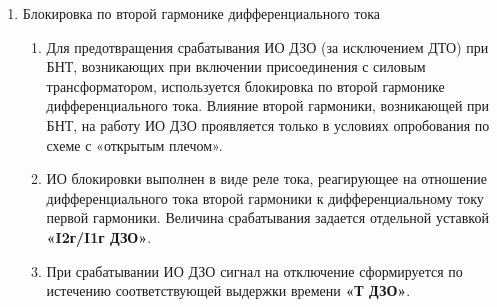 \begin{enumerate}[label=\arabic{section}.\arabic{subsection}.\arabic{enumi}, labelsep=4pt, leftmargin=0pt, itemindent=57pt, itemsep=0pt, parsep=5pt]
\begin{enumerate}[label=\arabic{section}.\arabic{subsection}.\arabic{enumi}.\arabic*, labelsep=4pt, leftmargin=0em, itemindent=65pt, parsep=0pt]
\item
В устройстве предусмотрено два подхода для надежного отключения выключателей присоединений при
работе ДЗО, в том числе в режимах АПВ шин и опробования. Такие режимы могут сопровождаться пониженным
уровнем токов КЗ, в результате чего чувствительность дифференциальных органов может быть недостаточной.
Первый подход подразумевает применение ЧТО. Второй подход заключается в очувствлении уставок
тормозной характеристики, которые используются в ДОТХ, БДО и МДО.

\item
ЧТО выполнен в виде реле тока, включенного на дифференциальный ток. Ток срабатывания ЧТО задается отдельной уставкой: \textbf{«Iчто»}.

\item
Очувствление представляет собой автоматическую смену величины начального тока срабатывания
тормозной характеристики на более чувствительную уставку. Параметры тормозной характеристики в режиме
очувствления задаются отдельными уставками. Подробное описание алгоритма очувствления приведен в
разделе {\color{red}«Логика очувствления»}.

\end{enumerate}


\item Блокировка по второй гармонике дифференциального тока

\begin{enumerate}[label=\arabic{section}.\arabic{subsection}.\arabic{enumi}.\arabic*, labelsep=4pt, leftmargin=0em, itemindent=65pt, parsep=0pt]

\item
Для предотвращения срабатывания ИО ДЗО (за исключением ДТО) при БНТ, возникающих при
включении присоединения с силовым трансформатором, используется блокировка по второй гармонике
дифференциального тока. Влияние второй гармоники, возникающей при БНТ, на работу ИО ДЗО проявляется
только в условиях опробования по схеме с «открытым плечом».

\item
ИО блокировки выполнен в виде реле тока, реагирующее на отношение дифференциального тока второй
гармоники к дифференциальному току первой гармоники. Величина срабатывания задается отдельной
уставкой \textbf{«I2г/I1г ДЗО»}.

\item
При срабатывании ИО ДЗО сигнал на отключение сформируется по истечению соответствующей выдержки времени \textbf{«Т ДЗО»}.


\end{enumerate}
\end{enumerate}
